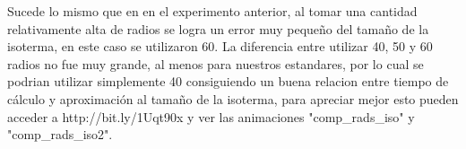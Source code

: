 Sucede lo mismo que en en el experimento anterior, al tomar una cantidad relativamente alta de radios se logra un error muy pequeño del tamaño de la isoterma, en este caso se utilizaron 60. La diferencia entre utilizar 40, 50 y 60 radios no fue muy grande, al menos para nuestros estandares, por lo cual se podrian utilizar simplemente 40 consiguiendo un buena relacion entre tiempo de cálculo y aproximación al tamaño de la isoterma, para apreciar mejor esto pueden acceder a http://bit.ly/1Uqt90x y ver las animaciones "comp\_rads\_iso" y "comp\_rads\_iso2".

